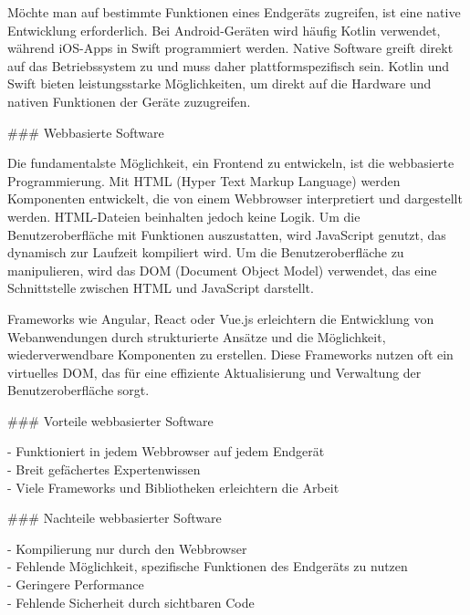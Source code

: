 \documentclass[a4paper,12pt]{article}
\begin{document}
Möchte man auf bestimmte Funktionen eines Endgeräts zugreifen, ist eine native Entwicklung erforderlich. Bei Android-Geräten wird häufig Kotlin verwendet, während iOS-Apps in Swift programmiert werden. Native Software greift direkt auf das Betriebssystem zu und muss daher plattformspezifisch sein. Kotlin und Swift bieten leistungsstarke Möglichkeiten, um direkt auf die Hardware und nativen Funktionen der Geräte zuzugreifen.

\vspace{0.5cm}

### Webbasierte Software

Die fundamentalste Möglichkeit, ein Frontend zu entwickeln, ist die webbasierte Programmierung. Mit HTML (Hyper Text Markup Language) werden Komponenten entwickelt, die von einem Webbrowser interpretiert und dargestellt werden. HTML-Dateien beinhalten jedoch keine Logik. Um die Benutzeroberfläche mit Funktionen auszustatten, wird JavaScript genutzt, das dynamisch zur Laufzeit kompiliert wird. Um die Benutzeroberfläche zu manipulieren, wird das DOM (Document Object Model) verwendet, das eine Schnittstelle zwischen HTML und JavaScript darstellt.

\vspace{0.5cm}

Frameworks wie Angular, React oder Vue.js erleichtern die Entwicklung von Webanwendungen durch strukturierte Ansätze und die Möglichkeit, wiederverwendbare Komponenten zu erstellen. Diese Frameworks nutzen oft ein virtuelles DOM, das für eine effiziente Aktualisierung und Verwaltung der Benutzeroberfläche sorgt.

\vspace{0.5cm}

### Vorteile webbasierter Software

- Funktioniert in jedem Webbrowser auf jedem Endgerät \\
- Breit gefächertes Expertenwissen \\
- Viele Frameworks und Bibliotheken erleichtern die Arbeit

\vspace{0.5cm}

### Nachteile webbasierter Software

- Kompilierung nur durch den Webbrowser \\
- Fehlende Möglichkeit, spezifische Funktionen des Endgeräts zu nutzen \\
- Geringere Performance \\
- Fehlende Sicherheit durch sichtbaren Code
\end{document}
